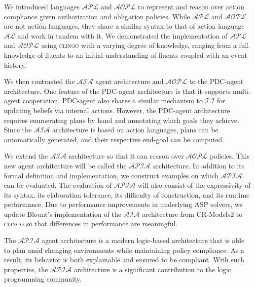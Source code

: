 We introduced languages $\mathcal{APL}$ and $\mathcal{AOPL}$ to represent and reason over action compliance given authorization and obligation policies.
While $\mathcal{APL}$ and $\mathcal{AOPL}$ are not action languages, they share a similar syntax to that of action language $\mathcal{AL}$ and work in tandem with it.
We demonstrated the implementation of $\mathcal{APL}$ and $\mathcal{AOPL}$ using \textsc{clingo} with a varying degree of knowledge, ranging from a full knowledge of fluents to an initial understanding of fluents coupled with an event history.

We then contrasted the $\mathcal{AIA}$ agent architecture and $\mathcal{AOPL}$ to the PDC-agent architecture.
One feature of the PDC-agent architecture is that it supports multi-agent cooperation.
PDC-agent also shares a similar mechanism to $\mathcal{TI}$ for updating beliefs via internal actions.
However, the PDC-agent architecture requires enumerating plans by hand and annotating which goals they achieve.
Since the $\mathcal{AIA}$ architecture is based on action languages, plans can be automatically generated, and their respective end-goal can be computed.

We extend the $\mathcal{AIA}$ architecture so that it can reason over $\mathcal{AOPL}$ policies.
This new agent architecture will be called the $\mathcal{APIA}$ architecture.
In addition to its formal definition and implementation, we construct examples on which $\mathcal{APIA}$ can be evaluated.
The evaluation of $\mathcal{APIA}$ will also consist of the expressivity of its syntax, its elaboration tolerance, its difficulty of construction, and its runtime performance.
Due to performance improvements in underlying ASP solvers, we update Blount's implementation of the $\mathcal{AIA}$ architecture from CR-Models2 to \textsc{clingo} so that differences in performance are meaningful.

The $\mathcal{APIA}$ agent architecture is a modern logic-based architecture that is able to plan amid changing environments while maintaining policy compliance.
As a result, its behavior is both explainable and ensured to be compliant.
With such properties, the $\mathcal{APIA}$ architecture is a significant contribution to the logic programming community.

